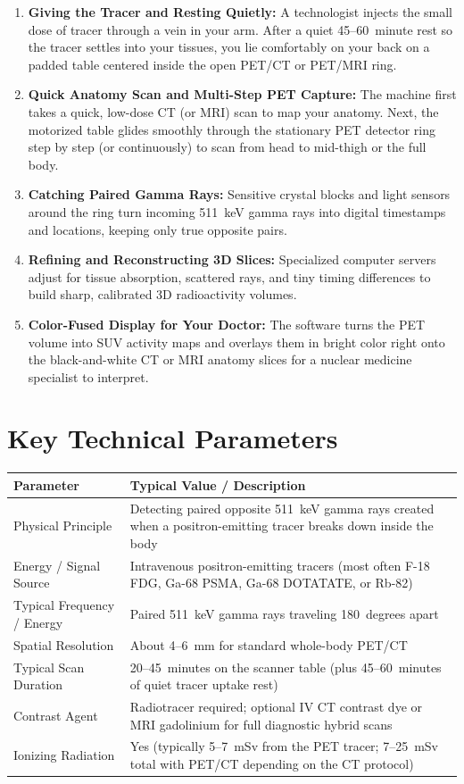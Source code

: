 \begin{enumerate}
    \item \textbf{Giving the Tracer and Resting Quietly:} A technologist injects the small dose of tracer through a vein in your arm. After a quiet 45--60~minute rest so the tracer settles into your tissues, you lie comfortably on your back on a padded table centered inside the open PET/CT or PET/MRI ring.
    \item \textbf{Quick Anatomy Scan and Multi-Step PET Capture:} The machine first takes a quick, low-dose CT (or MRI) scan to map your anatomy. Next, the motorized table glides smoothly through the stationary PET detector ring step by step (or continuously) to scan from head to mid-thigh or the full body.
    \item \textbf{Catching Paired Gamma Rays:} Sensitive crystal blocks and light sensors around the ring turn incoming 511~keV gamma rays into digital timestamps and locations, keeping only true opposite pairs.
    \item \textbf{Refining and Reconstructing 3D Slices:} Specialized computer servers adjust for tissue absorption, scattered rays, and tiny timing differences to build sharp, calibrated 3D radioactivity volumes.
    \item \textbf{Color-Fused Display for Your Doctor:} The software turns the PET volume into SUV activity maps and overlays them in bright color right onto the black-and-white CT or MRI anatomy slices for a nuclear medicine specialist to interpret.
\end{enumerate}

\section{Key Technical Parameters}

\noindent
\begin{tabularx}{\textwidth}{@{}l X@{}}
\toprule
\textbf{Parameter} & \textbf{Typical Value / Description} \\
\midrule
Physical Principle & Detecting paired opposite 511~keV gamma rays created when a positron-emitting tracer breaks down inside the body \\
Energy / Signal Source & Intravenous positron-emitting tracers (most often F-18 FDG, Ga-68 PSMA, Ga-68 DOTATATE, or Rb-82) \\
Typical Frequency / Energy & Paired 511~keV gamma rays traveling 180~degrees apart \\
Spatial Resolution & About 4--6~mm for standard whole-body PET/CT \\
Typical Scan Duration & 20--45~minutes on the scanner table (plus 45--60~minutes of quiet tracer uptake rest) \\
Contrast Agent & Radiotracer required; optional IV CT contrast dye or MRI gadolinium for full diagnostic hybrid scans \\
Ionizing Radiation & Yes (typically 5--7~mSv from the PET tracer; 7--25~mSv total with PET/CT depending on the CT protocol) \\
\bottomrule
\end{tabularx}

